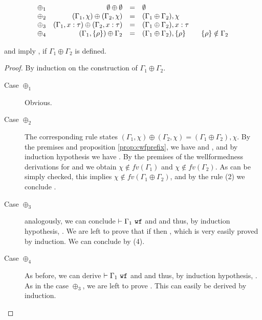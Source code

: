 \documentclass[a4paper]{article}
\begin{document}
\begin{equation*}
  \begin{array}[]{lrcl}
  \oplus_1 & \emptyset \oplus \emptyset & = & \emptyset \\
  \oplus_2 & (\Gamma_1, \chi) \oplus (\Gamma_2, \chi) & = & (\Gamma_1 \oplus \Gamma_2),\chi \\
  \oplus_3 & (\Gamma_1, x : \tau) \oplus (\Gamma_2, x : \tau) & = & (\Gamma_1 \oplus \Gamma_2),x:\tau \\
  \oplus_4 & (\Gamma_1,\capreg{\rho}) \oplus \Gamma_2 & = & (\Gamma_1 \oplus
              \Gamma_2),\capreg{\rho}\qquad \capreg{\rho}\notin \Gamma_2 \\
  \end{array}
\end{equation*}

\begin{prop}
   and  imply , if $\Gamma_1\oplus \Gamma_2$ is
  defined.
  \label{prop:cwfoplus}
\end{prop}
\begin{proof}
  By induction on the construction of $\Gamma_1\oplus \Gamma_2$.
  \begin{description}
    \item[Case $\oplus_1$] Obvious.

    \item[Case $\oplus_2$] The corresponding rule states $(\Gamma_1, \chi) \oplus
      (\Gamma_2, \chi) = (\Gamma_1 \oplus \Gamma_2),\chi$. By the premises and proposition
      \ref{prop:cwfprefix}, we have  and , and by induction
      hypothesis we have . By the premises of the
      wellformedness derivations for  and  we obtain
      $\chi\notin fv(\Gamma_1)$ and $\chi\notin fv(\Gamma_2)$. As can be simply checked, this
      implies $\chi\notin fv(\Gamma_1 \oplus \Gamma_2)$, and by the rule (2) we conclude
      .

   \item[Case $\oplus_3$] analogously, we can conclude ${\normalfont \vdash \Gamma_1\ \texttt{wf}}$ and
      and thus, by induction hypothesis, . We are
     left to prove that if  then , which
     is very easily proved by induction. We can conclude  by (4).

   \item[Case $\oplus_4$ ] As before, we can derive ${\normalfont \vdash \Gamma_1\ \texttt{wf}}$ and 
     and thus, by induction hypothesis, . As in the case
     $\oplus_3$, we are left to prove . This can
     easily be derived by induction. 
 \end{description}
\end{proof}
\end{document}
